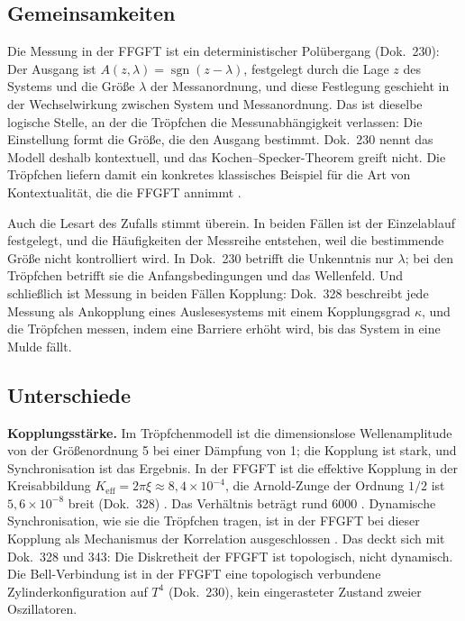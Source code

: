 \subsection{Gemeinsamkeiten}

Die Messung in der FFGFT ist ein deterministischer Polübergang (Dok.~230): Der Ausgang ist
$A(z,\lambda)=\operatorname{sgn}(z-\lambda)$, festgelegt durch die Lage $z$ des Systems und die
Größe $\lambda$ der Messanordnung, und diese Festlegung geschieht in der Wechselwirkung zwischen
System und Messanordnung. Das ist dieselbe logische Stelle, an der die Tröpfchen die
Messunabhängigkeit verlassen: Die Einstellung formt die Größe, die den Ausgang bestimmt. Dok.~230
nennt das Modell deshalb kontextuell, und das Kochen--Specker-Theorem greift nicht. Die Tröpfchen
liefern damit ein konkretes klassisches Beispiel für die Art von Kontextualität, die die FFGFT
annimmt \SM.

Auch die Lesart des Zufalls stimmt überein. In beiden Fällen ist der Einzelablauf festgelegt, und
die Häufigkeiten der Messreihe entstehen, weil die bestimmende Größe nicht kontrolliert wird. In
Dok.~230 betrifft die Unkenntnis nur $\lambda$; bei den Tröpfchen betrifft sie die Anfangsbedingungen
und das Wellenfeld. Und schließlich ist Messung in beiden Fällen Kopplung: Dok.~328 beschreibt jede
Messung als Ankopplung eines Auslesesystems mit einem Kopplungsgrad $\kappa$, und die Tröpfchen
messen, indem eine Barriere erhöht wird, bis das System in eine Mulde fällt.

\subsection{Unterschiede}

\textbf{Kopplungsstärke.} Im Tröpfchenmodell ist die dimensionslose Wellenamplitude von der
Größenordnung 5 bei einer Dämpfung von 1; die Kopplung ist stark, und Synchronisation ist das
Ergebnis. In der FFGFT ist die effektive Kopplung in der Kreisabbildung $K_{\mathrm{eff}}=2\pi\xi
\approx8{,}4\times10^{-4}$, die Arnold-Zunge der Ordnung $1/2$ ist $5{,}6\times10^{-8}$ breit
(Dok.~328) \KM. Das Verhältnis beträgt rund 6000 \KM. Dynamische Synchronisation, wie sie die
Tröpfchen tragen, ist in der FFGFT bei dieser Kopplung als Mechanismus der Korrelation
ausgeschlossen \XM. Das deckt sich mit Dok.~328 und 343: Die Diskretheit der FFGFT ist topologisch,
nicht dynamisch. Die Bell-Verbindung ist in der FFGFT eine topologisch verbundene
Zylinderkonfiguration auf $T^4$ (Dok.~230), kein eingerasteter Zustand zweier Oszillatoren.

